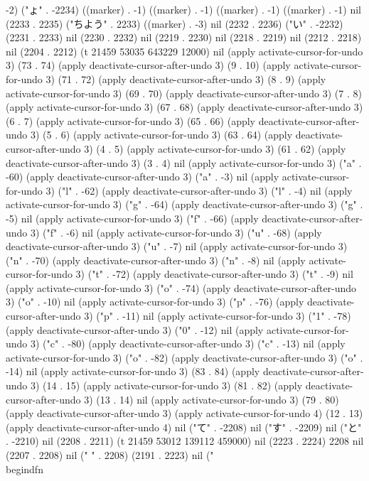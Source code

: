 -2) ("ょ" . -2234) ((marker) . -1) ((marker) . -1) ((marker) . -1) ((marker) . -1) nil (2233 . 2235) ("ちよう" . 2233) ((marker) . -3) nil (2232 . 2236) ("い" . -2232) (2231 . 2233) nil (2230 . 2232) nil (2219 . 2230) nil (2218 . 2219) nil (2212 . 2218) nil (2204 . 2212) (t 21459 53035 643229 12000) nil (apply activate-cursor-for-undo 3) (73 . 74) (apply deactivate-cursor-after-undo 3) (9 . 10) (apply activate-cursor-for-undo 3) (71 . 72) (apply deactivate-cursor-after-undo 3) (8 . 9) (apply activate-cursor-for-undo 3) (69 . 70) (apply deactivate-cursor-after-undo 3) (7 . 8) (apply activate-cursor-for-undo 3) (67 . 68) (apply deactivate-cursor-after-undo 3) (6 . 7) (apply activate-cursor-for-undo 3) (65 . 66) (apply deactivate-cursor-after-undo 3) (5 . 6) (apply activate-cursor-for-undo 3) (63 . 64) (apply deactivate-cursor-after-undo 3) (4 . 5) (apply activate-cursor-for-undo 3) (61 . 62) (apply deactivate-cursor-after-undo 3) (3 . 4) nil (apply activate-cursor-for-undo 3) ("a" . -60) (apply deactivate-cursor-after-undo 3) ("a" . -3) nil (apply activate-cursor-for-undo 3) ("l" . -62) (apply deactivate-cursor-after-undo 3) ("l" . -4) nil (apply activate-cursor-for-undo 3) ("g" . -64) (apply deactivate-cursor-after-undo 3) ("g" . -5) nil (apply activate-cursor-for-undo 3) ("f" . -66) (apply deactivate-cursor-after-undo 3) ("f" . -6) nil (apply activate-cursor-for-undo 3) ("u" . -68) (apply deactivate-cursor-after-undo 3) ("u" . -7) nil (apply activate-cursor-for-undo 3) ("n" . -70) (apply deactivate-cursor-after-undo 3) ("n" . -8) nil (apply activate-cursor-for-undo 3) ("t" . -72) (apply deactivate-cursor-after-undo 3) ("t" . -9) nil (apply activate-cursor-for-undo 3) ("o" . -74) (apply deactivate-cursor-after-undo 3) ("o" . -10) nil (apply activate-cursor-for-undo 3) ("p" . -76) (apply deactivate-cursor-after-undo 3) ("p" . -11) nil (apply activate-cursor-for-undo 3) ("1" . -78) (apply deactivate-cursor-after-undo 3) ("0" . -12) nil (apply activate-cursor-for-undo 3) ("c" . -80) (apply deactivate-cursor-after-undo 3) ("c" . -13) nil (apply activate-cursor-for-undo 3) ("o" . -82) (apply deactivate-cursor-after-undo 3) ("o" . -14) nil (apply activate-cursor-for-undo 3) (83 . 84) (apply deactivate-cursor-after-undo 3) (14 . 15) (apply activate-cursor-for-undo 3) (81 . 82) (apply deactivate-cursor-after-undo 3) (13 . 14) nil (apply activate-cursor-for-undo 3) (79 . 80) (apply deactivate-cursor-after-undo 3) (apply activate-cursor-for-undo 4) (12 . 13) (apply deactivate-cursor-after-undo 4) nil ("て" . -2208) nil ("す" . -2209) nil ("と" . -2210) nil (2208 . 2211) (t 21459 53012 139112 459000) nil (2223 . 2224) 2208 nil (2207 . 2208) nil (" " . 2208) (2191 . 2223) nil ("\\begin{dfn}
 
